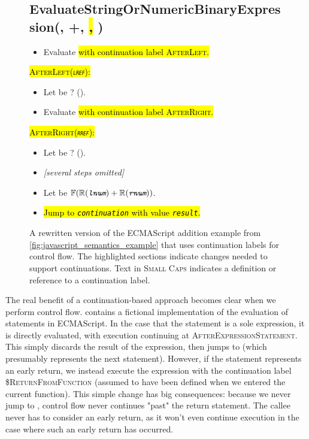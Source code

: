 \begin{figure}
  \subsection*{EvaluateStringOrNumericBinaryExpression(, +, \hl{, })}
  \begin{itemize}
    \item Evaluate \hl{ with continuation label \textsc{AfterLeft}.}
  \end{itemize}
\hl{\textsc{\small AfterLeft(\textit{\texttt{lref}})}:}
  \begin{itemize}
    \item Let  be ? ().
    \item Evaluate \hl{ with continuation label \textsc{AfterRight}.}
  \end{itemize}
\hl{\textsc{\small AfterRight(\textit{\texttt{rref}})}:}
  \begin{itemize}
    \item Let  be ? ().
    \item \textit{[several steps omitted]}
    \item Let  be $ \mathbb{F}(\mathbb{R}(\textit{\texttt{lnum}}) + \mathbb{R}(\textit{\texttt{rnum}})) $.
    \item \hl{Jump to \textit{\texttt{continuation}} with value \textit{\texttt{result}}.}
  \end{itemize}
  \caption{A rewritten version of the ECMAScript addition example from \cref{fig:javascript_semantics_example} that uses continuation labels for control flow. The highlighted sections indicate changes needed to support continuations. Text in \textsc{Small Caps} indicates a definition or reference to a continuation label.}
  \label{fig:continuation_introduction}
\end{figure}

The real benefit of a continuation-based approach becomes clear when we perform control flow.  contains a fictional implementation of the evaluation of statements in ECMAScript. In the case that the statement is a sole expression, it is directly evaluated, with execution continuing at \textsc{AfterExpressionStatement}. This simply discards the result of the expression, then jumps to  (which presumably represents the next statement). However, if the statement represents an early return, we instead execute the expression with the continuation label \textsc{\$ReturnFromFunction} (assumed to have been defined when we entered the current function). This simple change has big consequences: because we never jump to , control flow never continues "past" the return statement. The callee never has to consider an early return, as it won't even continue execution in the case where such an early return has occurred.\\

